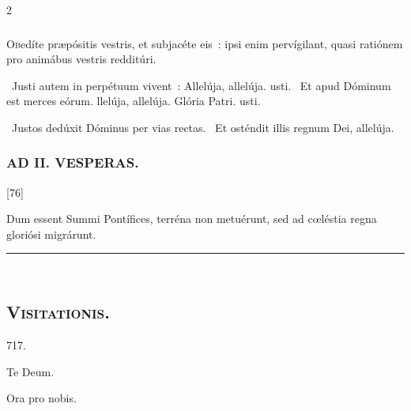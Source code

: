 \documentclass[9pt,twoside]{extarticle}
\begin{document}
\begin{multicols}{2}
\subsubsection*{}
\lettrine{O}bedíte præpósitis vestris, et subjacéte eis~: ipsi enim pervígilant, quasi ratiónem pro animábus vestris redditúri.

\begin{tightlist}{}
\item {}~Justi autem in perpétuum vivent~: \textred{*} Allelúja, allelúja. usti. ~Et apud Dóminum est merces eórum. llelúja, allelúja. Glória Patri. usti.
\item {}~Justos dedúxit Dóminus per vias rectas. ~Et osténdit illis regnum Dei, allelúja.
\end{tightlist}

\subsubsection*{\center \textsc{AD II. VESPERAS.}}
\begin{tightlist}{}
\item {} [76]
\item {}
\item {} Dum essent Summi Pontífices, terréna non metuérunt, sed ad cœléstia regna gloriósi migrárunt.
\item {}
\end{tightlist}

\begin{center}\textcolor{red}{\rule{\linewidth}{0.5pt}} \end{center}

\subsection*{\center \textsc{\\ Visitationis.}}
\begin{tightlist}{}
\item {} 717. 
\item {}
\item Te Deum.
\item {} Ora pro nobis.
\end{tightlist}


\end{multicols}
\end{document}
